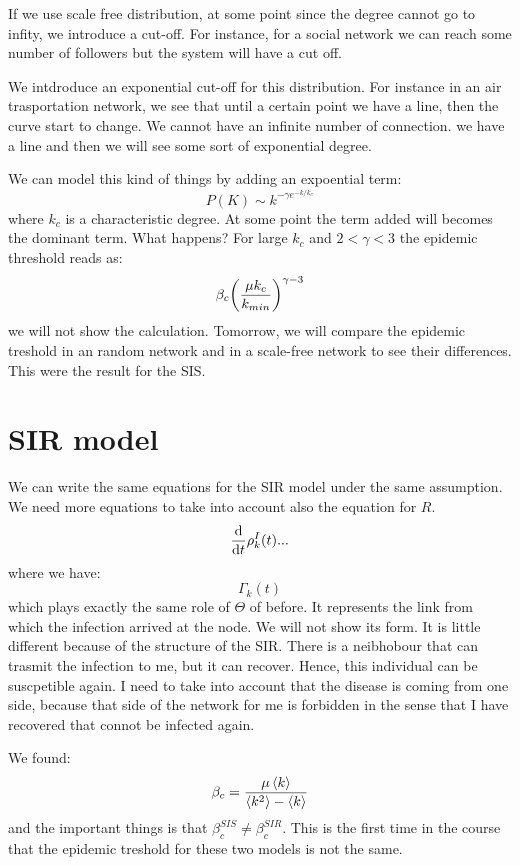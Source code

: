 \documentclass[../main/main.tex]{subfiles}
\begin{document}
If we use scale free distribution, at some point since the degree cannot go to infity, we introduce a cut-off. For instance, for a social network we can reach some number of followers but the system will have a cut off.

 We intdroduce an exponential cut-off for this distribution. For instance in an air trasportation network, we see that until a certain point we have a line, then the curve start to change. We cannot have an infinite number of connection. we have a line and then we will see some sort of exponential degree.

 We can model this kind of things by adding an expoential term:
 \begin{equation*}
   P(K) \sim k^{- \gamma   e^{-k/k_c} }
 \end{equation*}
where \( k_c \) is a characteristic degree. At some point the term added will becomes the dominant term. What happens? For large \( k_c \) and \( 2 < \gamma < 3  \) the epidemic threshold reads as:
\begin{equation*}
  \beta _c \qty(\frac{\mu k_c}{k_{min}})^{\gamma -3 }
\end{equation*}
we will not show the calculation. Tomorrow, we will compare the epidemic treshold in an random network and in a scale-free network to see their differences.
This were the result for the SIS.

\section{SIR model}
We can write the same equations for the SIR model under the same assumption. We need more equations to take into account also the equation for \( R \).
\begin{equation*}
  \dv{}{t} \rho _k^I(t) ...
\end{equation*}
where we have:
\begin{equation*}
  \Gamma _k (t)
\end{equation*}
which plays exactly the same role of \( \Theta  \) of before. It represents the link from which the infection arrived at the node. We will not show its form.  It is little different because of the structure of the SIR.
There is a neibhobour that can trasmit the infection to me, but it can recover. Hence, this individual can be suscpetible again.
I need to take into account that the disease is coming from one side, because that side of the network for me is forbidden in the sense that I have recovered that connot be infected again.

We found:
\begin{equation*}
  \beta _c = \frac{\mu \expval{k} }{\expval{k^2} - \expval{k} }
\end{equation*}
and the important things is that \( \beta _c^{SIS} \neq \beta _c^{SIR} \). This is the first time in the course that the epidemic treshold for these two models is not the same.
\end{document}
